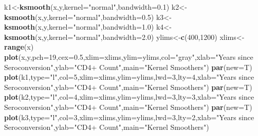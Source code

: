 \documentclass[]{article}
\newenvironment{Shaded}{\begin{snugshade}}{\end{snugshade}}
\newcommand{\DataTypeTok}[1]{\textcolor[rgb]{0.13,0.29,0.53}{#1}}
\newcommand{\DecValTok}[1]{\textcolor[rgb]{0.00,0.00,0.81}{#1}}
\newcommand{\FloatTok}[1]{\textcolor[rgb]{0.00,0.00,0.81}{#1}}
\newcommand{\KeywordTok}[1]{\textcolor[rgb]{0.13,0.29,0.53}{\textbf{#1}}}
\newcommand{\NormalTok}[1]{#1}
\newcommand{\StringTok}[1]{\textcolor[rgb]{0.31,0.60,0.02}{#1}}
\begin{document}
\begin{Shaded}
\begin{Highlighting}[]
{\NormalTok{k1<-}\KeywordTok{ksmooth}\NormalTok{(x,y,}\DataTypeTok{kernel=}\StringTok{"normal"}\NormalTok{,}\DataTypeTok{bandwidth=}\FloatTok{0.1}\NormalTok{)}
\NormalTok{k2<-}\KeywordTok{ksmooth}\NormalTok{(x,y,}\DataTypeTok{kernel=}\StringTok{"normal"}\NormalTok{,}\DataTypeTok{bandwidth=}\FloatTok{0.5}\NormalTok{)}
\NormalTok{k3<-}\KeywordTok{ksmooth}\NormalTok{(x,y,}\DataTypeTok{kernel=}\StringTok{"normal"}\NormalTok{,}\DataTypeTok{bandwidth=}\FloatTok{1.0}\NormalTok{)}
\NormalTok{k4<-}\KeywordTok{ksmooth}\NormalTok{(x,y,}\DataTypeTok{kernel=}\StringTok{"normal"}\NormalTok{,}\DataTypeTok{bandwidth=}\FloatTok{2.0}\NormalTok{)}
\NormalTok{ylims<-}\KeywordTok{c}\NormalTok{(}\DecValTok{400}\NormalTok{,}\DecValTok{1200}\NormalTok{)}
\NormalTok{xlims<-}\KeywordTok{range}\NormalTok{(x)}
\KeywordTok{plot}\NormalTok{(x,y,}\DataTypeTok{pch=}\DecValTok{19}\NormalTok{,}\DataTypeTok{cex=}\FloatTok{0.5}\NormalTok{,}\DataTypeTok{xlim=}\NormalTok{xlims,}\DataTypeTok{ylim=}\NormalTok{ylims,}\DataTypeTok{col=}\StringTok{"gray"}\NormalTok{,}\DataTypeTok{xlab=}\StringTok{"Years since Seroconversion"}\NormalTok{,}\DataTypeTok{ylab=}\StringTok{"CD4+ Count"}\NormalTok{,}\DataTypeTok{main=}\StringTok{"Kernel Smoothers"}\NormalTok{)}
\KeywordTok{par}\NormalTok{(}\DataTypeTok{new=}\NormalTok{T)}
\KeywordTok{plot}\NormalTok{(k1,}\DataTypeTok{type=}\StringTok{"l"}\NormalTok{,}\DataTypeTok{col=}\DecValTok{5}\NormalTok{,}\DataTypeTok{xlim=}\NormalTok{xlims,}\DataTypeTok{ylim=}\NormalTok{ylims,}\DataTypeTok{lwd=}\DecValTok{3}\NormalTok{,}\DataTypeTok{lty=}\DecValTok{4}\NormalTok{,}\DataTypeTok{xlab=}\StringTok{"Years since Seroconversion"}\NormalTok{,}\DataTypeTok{ylab=}\StringTok{"CD4+ Count"}\NormalTok{,}\DataTypeTok{main=}\StringTok{"Kernel Smoothers"}\NormalTok{)}
\KeywordTok{par}\NormalTok{(}\DataTypeTok{new=}\NormalTok{T)}
\KeywordTok{plot}\NormalTok{(k2,}\DataTypeTok{type=}\StringTok{"l"}\NormalTok{,}\DataTypeTok{col=}\DecValTok{4}\NormalTok{,}\DataTypeTok{xlim=}\NormalTok{xlims,}\DataTypeTok{ylim=}\NormalTok{ylims,}\DataTypeTok{lwd=}\DecValTok{3}\NormalTok{,}\DataTypeTok{lty=}\DecValTok{3}\NormalTok{,}\DataTypeTok{xlab=}\StringTok{"Years since Seroconversion"}\NormalTok{,}\DataTypeTok{ylab=}\StringTok{"CD4+ Count"}\NormalTok{,}\DataTypeTok{main=}\StringTok{"Kernel Smoothers"}\NormalTok{)}
\KeywordTok{par}\NormalTok{(}\DataTypeTok{new=}\NormalTok{T)}
\KeywordTok{plot}\NormalTok{(k3,}\DataTypeTok{type=}\StringTok{"l"}\NormalTok{,}\DataTypeTok{col=}\DecValTok{3}\NormalTok{,}\DataTypeTok{xlim=}\NormalTok{xlims,}\DataTypeTok{ylim=}\NormalTok{ylims,}\DataTypeTok{lwd=}\DecValTok{3}\NormalTok{,}\DataTypeTok{lty=}\DecValTok{2}\NormalTok{,}\DataTypeTok{xlab=}\StringTok{"Years since Seroconversion"}\NormalTok{,}\DataTypeTok{ylab=}\StringTok{"CD4+ Count"}\NormalTok{,}\DataTypeTok{main=}\StringTok{"Kernel Smoothers"}\NormalTok{)}
}
\end{Highlighting}
\end{Shaded}
\end{document}
